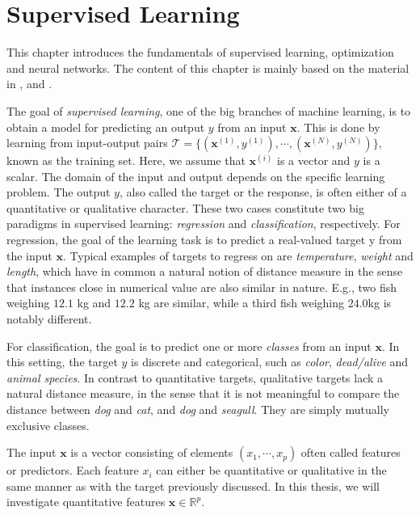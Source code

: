 \chapter{Supervised Learning}\label{chap:SupervisedLearning}

This chapter introduces the fundamentals of supervised learning, optimization and neural networks. The content of this chapter is mainly based on the material in \citet{SupervisedwquantumComputers}, \citet{hastie01statisticallearning} and \citet{nielsenneural}.

The goal of \emph{supervised learning}, one of the big branches of machine learning, is to obtain a model for predicting an output $y$ from an input $\boldsymbol{x}$. This is done by learning from input-output pairs $\mathcal{T} = \{(\boldsymbol{x}^{(1)}, y^{(1)}), \cdots, (\boldsymbol{x}^{(N)}, y^{(N)})\}$, known as the training set. Here, we assume that $\boldsymbol{x}^{(i)}$ is a vector and $y$ is a scalar. The domain of the input and output depends on the specific learning problem. The output $y$, also called the target or the response, is often either of a quantitative or qualitative character. These two cases constitute two big paradigms in supervised learning: \emph{regression} and \emph{classification}, respectively. For regression, the goal of the learning task is to predict a real-valued target y from the input $\boldsymbol{x}$. Typical examples of targets to regress on are \emph{temperature}, \emph{weight} and \emph{length}, which have in common a natural notion of distance measure in the sense that instances close in numerical value are also similar in nature. E.g., two fish weighing $12.1$ kg and $12.2$ kg are similar, while a third fish weighing $24.0$kg is notably different.

For classification, the goal is to predict one or more \emph{classes} from an input $\boldsymbol{x}$. In this setting, the target $y$ is discrete and categorical, such as \emph{color}, \emph{dead/alive} and \emph{animal species}. In contrast to quantitative targets, qualitative targets lack a natural distance measure, in the sense that it is not meaningful to compare the distance between \emph{dog} and \emph{cat}, and \emph{dog} and \emph{seagull}. They are simply mutually exclusive classes.

The input $\boldsymbol{x}$ is a vector consisting of elements $(x_1, \cdots, x_p)$ often called features or predictors. Each feature $x_i$ can either be quantitative or qualitative in the same manner as with the target previously discussed. In this thesis, we will investigate quantitative features $\boldsymbol{x} \in \mathbb{R}^{p}$.



